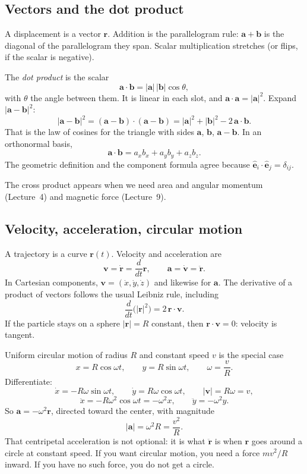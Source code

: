 \documentclass[11pt]{article}
\numberwithin{equation}{section}
\newcommand{\ddt}{\frac{d}{dt}}
\newcommand{\vect}[1]{\mathbf{#1}}
\begin{document}
\subsection{Vectors and the dot product}

A displacement is a vector $\vect{r}$. Addition is the parallelogram rule: $\vect{a}+\vect{b}$ is the diagonal of the parallelogram they span. Scalar multiplication stretches (or flips, if the scalar is negative).

The \emph{dot product} is the scalar
\[
\vect{a}\cdot\vect{b} = |\vect{a}|\,|\vect{b}|\cos\theta,
\]
with $\theta$ the angle between them. It is linear in each slot, and $\vect{a}\cdot\vect{a}=|\vect{a}|^2$. Expand $|\vect{a}-\vect{b}|^2$:
\[
|\vect{a}-\vect{b}|^2
= (\vect{a}-\vect{b})\cdot(\vect{a}-\vect{b})
= |\vect{a}|^2 + |\vect{b}|^2 - 2\,\vect{a}\cdot\vect{b}.
\]
That is the law of cosines for the triangle with sides $\vect{a}$, $\vect{b}$, $\vect{a}-\vect{b}$. In an orthonormal basis,
\[
\vect{a}\cdot\vect{b} = a_x b_x + a_y b_y + a_z b_z.
\]
The geometric definition and the component formula agree because $\hat{\vect{e}}_i\cdot\hat{\vect{e}}_j=\delta_{ij}$.

The cross product appears when we need area and angular momentum (Lecture~4) and magnetic force (Lecture~9).

\subsection{Velocity, acceleration, circular motion}

A trajectory is a curve $\vect{r}(t)$. Velocity and acceleration are
\[
\vect{v} = \dot{\vect{r}} = \ddt\vect{r},\qquad
\vect{a} = \dot{\vect{v}} = \ddot{\vect{r}}.
\]
In Cartesian components, $\vect{v}=(\dot x,\dot y,\dot z)$ and likewise for $\vect{a}$. The derivative of a product of vectors follows the usual Leibniz rule, including
\[
\ddt\bigl(|\vect{r}|^2\bigr) = 2\,\vect{r}\cdot\vect{v}.
\]
If the particle stays on a sphere $|\vect{r}|=R$ constant, then $\vect{r}\cdot\vect{v}=0$: velocity is tangent.

Uniform circular motion of radius $R$ and constant speed $v$ is the special case
\[
x = R\cos\omega t,\qquad y = R\sin\omega t,\qquad \omega = \frac{v}{R}.
\]
Differentiate:
\[
\dot x = -R\omega\sin\omega t,\qquad
\dot y = R\omega\cos\omega t,\qquad
|\vect{v}| = R\omega = v,
\]
\[
\ddot x = -R\omega^2\cos\omega t = -\omega^2 x,\qquad
\ddot y = -\omega^2 y.
\]
So $\vect{a}=-\omega^2\vect{r}$, directed toward the center, with magnitude
\[
|\vect{a}| = \omega^2 R = \frac{v^2}{R}.
\]
That centripetal acceleration is not optional: it is what $\ddot{\vect{r}}$ is when $\vect{r}$ goes around a circle at constant speed. If you want circular motion, you need a force $m v^2/R$ inward. If you have no such force, you do not get a circle.
\end{document}
